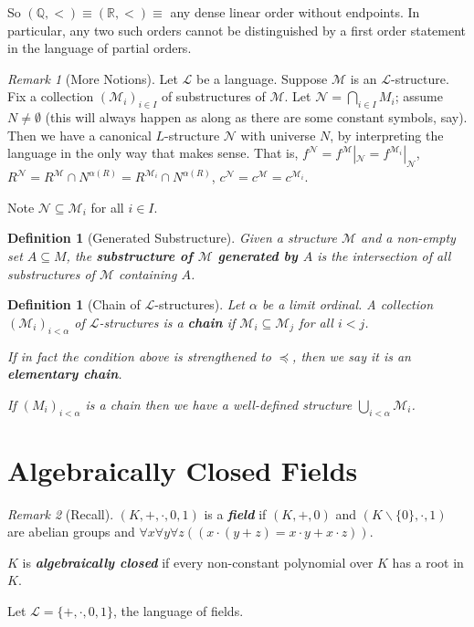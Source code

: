 \documentclass[]{article}
\theoremstyle{custhm}
\theoremstyle{cusdef}
\newtheorem{defin}[theorem]{Definition}
\theoremstyle{custhm}
\theoremstyle{custhm}
\theoremstyle{custhm}
\theoremstyle{ex}
\theoremstyle{custhm}
\theoremstyle{cusdef}
\theoremstyle{remark}
\newtheorem*{remark*}{Remark}
\theoremstyle{remark}
\theoremstyle{numremark}
\newcommand{\Q}{\mathbb{Q}}
\newcommand{\R}{\mathbb{R}}
\newcommand{\undf}[1]{\textit{\textbf{#1}}}
\renewcommand{\L}{\mathcal{L}}
\newcommand{\M}{\mathcal{M}}
\newcommand{\N}{\mathcal{N}}
\renewcommand{\subset}{\subseteq}
\begin{document}
So $(\Q,<) \equiv (\R,<)\equiv $ any dense linear order without endpoints. In particular, any two such orders cannot be distinguished by a first order statement in the language of partial orders.

\begin{remark*}[More Notions]
Let $\L$ be a language. Suppose $\M$ is an $\L$-structure. Fix a collection $(\M_i)_{i\in I}$ of substructures of $\M$. Let $\N = \bigcap_{i\in I}M_i$; assume $N \ne \emptyset$ (this will always happen as along as there are some constant symbols, say). Then we have a canonical $L$-structure $\N$ with universe $N$, by interpreting the language in the only way that makes sense. That is, $f^\N = f^\M |_\N = f^{\M_i} |_\N$, $R^\N = R^\M \cap N^{\alpha(R)} = R^{\M_i}\cap N^{\alpha(R)}$, $c^\N = c^\M = c^{\M_i}$.

Note $\N \subset \M_i$ for all $i\in I$.
\end{remark*}
\begin{defin}[Generated Substructure]
Given a structure $\M$ and a non-empty set $A\subset M$, the \undf{substructure of $\M$ generated by $A$} is the intersection of all substructures of $\M$ containing $A$.
\end{defin}

\begin{defin}[Chain of $\L$-structures]
Let $\alpha$ be a limit ordinal. A collection $(\M_i)_{i<\alpha}$ of $\L$-structures is a \undf{chain} if $\M_i \subset \M_{j}$ for all $i < j$.

If in fact the condition above is strengthened to $\preceq$, then we say it is an \undf{elementary chain}.

If $(M_i)_{i<\alpha}$ is a chain then we have a well-defined structure $\bigcup_{i < \alpha}\M_i$.
\end{defin}


\section{Algebraically Closed Fields}

\begin{remark*}[Recall]
$(K,+,\cdot,0,1)$ is a \undf{field} if $(K,+,0)$ and $(K\backslash\{0\},\cdot,1)$ are abelian groups and $\forall x\forall y\forall z((x\cdot(y+z) = x\cdot y + x\cdot z))$.

$K$ is \undf{algebraically closed} if every non-constant polynomial over $K$ has a root in $K$.
\end{remark*}
Let $\L = \{+,\cdot,0,1\}$, the language of fields.
\end{document}
